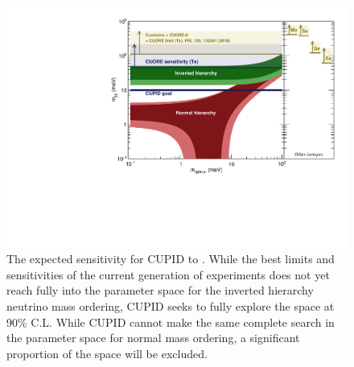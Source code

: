 \begin{figure}
    \centering
    \includegraphics[width=0.8\linewidth]{Figures/Lobster_plot_cupid_mlightest_CL.pdf}
    \caption[The expected sensitivity for CUPID to \zeronubb.]{The expected sensitivity for CUPID to \zeronubb.
    While the best limits and sensitivities of the current generation of experiments does not yet reach fully into the parameter space for the inverted hierarchy neutrino mass ordering, CUPID seeks to fully explore the space at 90\% C.L. While CUPID cannot make the same complete search in the parameter space for normal mass ordering, a significant proportion of the space will be excluded.}
    \label{fig:cupid_lobster_plot}
\end{figure}
